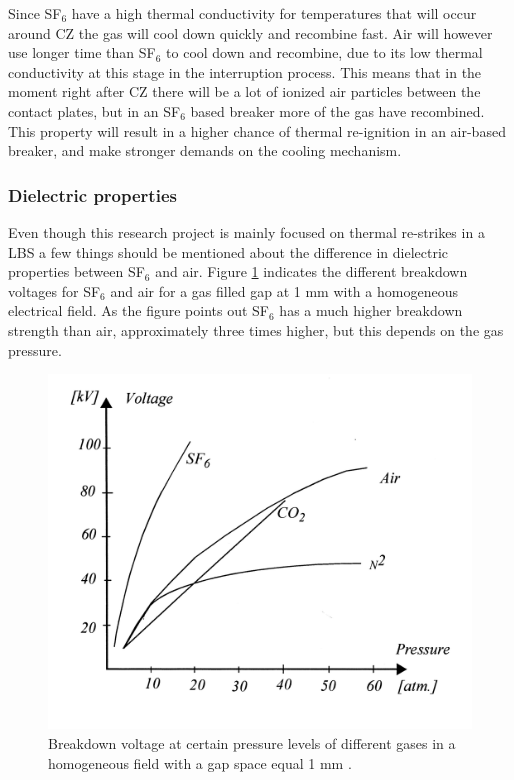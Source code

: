 \documentclass[10pt,a4paper]{article} %
\begin{document}
Since SF${_6}$ have a high thermal conductivity for temperatures that will occur around CZ the gas will cool down quickly and recombine fast. Air will however use longer time than SF${_6}$ to cool down and recombine, due to its low thermal conductivity at this stage in the interruption process. This means that in the moment right after CZ there will be a lot of ionized air particles between the contact plates, but in an SF${_6}$ based breaker more of the gas have recombined. This property will result in a higher chance of thermal re-ignition in an air-based breaker, and make stronger demands on the cooling mechanism.

\subsubsection*{Dielectric properties} 

Even though this research project is mainly focused on thermal re-strikes in a LBS a few things should be mentioned about the difference in dielectric properties between SF${_6}$ and air. Figure \ref{fig:breakDownVoltage} indicates the different breakdown voltages for SF$_6$ and air for a gas filled gap at 1 mm with a homogeneous electrical field. As the figure points out SF$_6$ has a much higher breakdown strength than air, approximately three times higher, but this depends on the gas pressure.

\begin{figure}[H]
\centering
\includegraphics[scale=1]{Bilder/Discussion/Breakdown_voltage.png}
\caption{Breakdown voltage at certain pressure levels of different gases in a homogeneous field with a gap space equal 1 mm  \cite{bib:TET4160HVIM}.} \label{fig:breakDownVoltage}
\end{figure}
\end{document}
